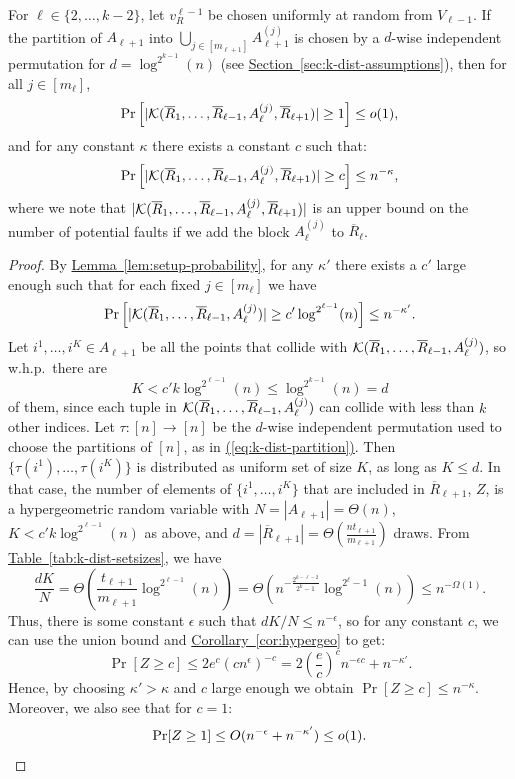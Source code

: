 \documentclass{article}
\newcommand{\eq}[1]{\hyperref[eq:#1]{(\ref*{eq:#1})}}
\renewcommand{\sec}[1]{\hyperref[sec:#1]{Section~\ref*{sec:#1}}}
\newcommand{\lem}[1]{\hyperref[lem:#1]{Lemma~\ref*{lem:#1}}}
\newcommand{\cor}[1]{\hyperref[cor:#1]{Corollary~\ref*{cor:#1}}}
\newcommand{\tabl}[1]{\hyperref[tab:#1]{Table~\ref*{tab:#1}}}
\renewcommand{\>}{\rangle}
\newcommand{\<}{\langle}
\renewcommand{\(}{\left(}
\renewcommand{\)}{\right)}
\begin{document}
\begin{corollary}\label{cor:fault-prob}
For $\ell\in\{2,\dots,k-2\}$, let $v_R^{\ell-1}$ be chosen uniformly at random from $V_{\ell-1}$. If the partition of $A_{\ell+1}$ into $\bigcup_{j\in [m_{\ell+1}]}A_{\ell+1}^{(j)}$ is chosen by a $d$-wise independent permutation for $d=\log^{2^{k-1}}(n)$ (see \sec{k-dist-assumptions}), then for all $j\in [m_{\ell}]$,
	$$\Pr\left[ |{\cal K}(\overline{R}_1,\dots,\overline{R}_{\ell-1},A_{\ell}^{(j)},\overline{R}_{\ell+1})|\geq 1\right] \leq o(1),$$
and for any constant $\kappa$ there exists a constant $c$ such that:
	$$\Pr\left[ |{\cal K}(\overline{R}_1,\dots,\overline{R}_{\ell-1},A_{\ell}^{(j)},\overline{R}_{\ell+1})|\geq c\right] \leq n^{-\kappa},$$
	where we note that $|{\cal K}(\overline{R}_1,\dots,\overline{R}_{\ell-1},A_{\ell}^{(j)},\overline{R}_{\ell+1})|$ is an upper bound on the number of potential faults if we add the block $A_{\ell}^{(j)}$ to $\overline{R}_{\ell}$. 
\end{corollary}
\begin{proof}
	By \lem{setup-probability}, for any $\kappa'$ there exists a $c'$ large enough such that for each fixed $j \in [m_{\ell}]$ we have
	$$\Pr\left[ |{\cal K}(\overline{R}_1,\dots,\overline{R}_{\ell-1},A_{\ell}^{(j)})|\geq c'\log^{2^{\ell-1}}(n)\right]\leq {n^{-\kappa'}}.$$
Let $i^{1},\dots,i^K\in A_{\ell+1}$ be all the points that collide with ${\cal K}(\overline{R}_1,\dots,\overline{R}_{\ell-1},A_{\ell}^{(j)})$, so w.h.p.~there are 
$$K < c'k\log^{2^{\ell-1}}(n) \leq \log^{2^{k-1}}(n)=d$$ 
of them, since each tuple in ${\cal K}(\overline{R}_1,\dots,\overline{R}_{\ell-1},A_{\ell}^{(j)})$ can collide with less than $k$ other indices. Let $\tau:[n]\rightarrow[n]$ be the $d$-wise independent permutation used to choose the partitions of $[n]$, as in \eq{k-dist-partition}. Then $\{\tau(i^1),\dots,\tau(i^K)\}$ is distributed as uniform set of size $K$, as long as $K\leq d$. In that case, the number of elements of $\{i^1,\dots,i^K\}$ that are included in $\overline{R}_{\ell+1}$, $Z$, is a hypergeometric random variable with $N=|A_{\ell+1}|=\Theta(n)$, $K< c'k\log^{2^{\ell-1}}(n)$ as above, and $d=|\overline{R}_{\ell+1}|=\Theta\left(\frac{nt_{\ell+1}}{m_{\ell+1}}\right)$ draws. 
From \tabl{k-dist-setsizes}, we have
	$$\frac{dK}{N}=\Theta\left(\frac{t_{\ell+1}}{m_{\ell+1}}\log^{2^{\ell-1}}(n)\right) = \Theta\left(n^{-\frac{2^{k-\ell-2}}{2^k-1}}\log^{2^{\ell}-1}(n)\right)\leq n^{-\Omega(1)}.$$
Thus, there is some constant $\epsilon$ such that $dK/N\leq n^{-\epsilon}$, so for any constant $c$, we can use the union bound and \cor{hypergeo} to get:
$$\Pr[Z\geq c]\leq 2e^c\left(cn^{\epsilon}\right)^{-c}=2\left(\frac{e}{c}\right)^c n^{-\epsilon c}+n^{-\kappa'}.$$
Hence, by choosing $\kappa' > \kappa$ and $c$ large enough we obtain $\Pr[Z\geq c] \leq n^{-\kappa}.$
Moreover, we also see that for $c=1$:
\begin{equation*}
\Pr[Z\geq 1]\leq O(n^{-\epsilon}+ n^{-\kappa'}) \leq o(1).\qedhere
\end{equation*}
\end{proof}
\end{document}
